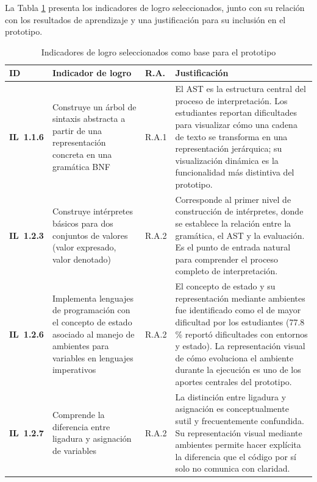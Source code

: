 La Tabla \ref{tabla:indicadores_logro_prototipo} presenta los indicadores de logro seleccionados, junto con su relación con los resultados de aprendizaje y una justificación para su inclusión en el prototipo.

\begin{table}[H]
\centering
\caption{Indicadores de logro seleccionados como base para el prototipo}
\label{tabla:indicadores_logro_prototipo}
\footnotesize
\setlength{\tabcolsep}{3pt}

\begin{tabular}{
>{\centering\arraybackslash}p{1.5cm}
>{\raggedright\arraybackslash}p{3.8cm}
>{\centering\arraybackslash}p{1cm}
>{\raggedright\arraybackslash}p{7cm}
}
\hline
\textbf{ID} & \textbf{Indicador de logro} & \textbf{R.A.} & \textbf{Justificación} \\
\hline

\textbf{IL~1.1.6} &
Construye un árbol de sintaxis abstracta a partir de una representación concreta en una gramática BNF &
R.A.1 &
El AST es la estructura central del proceso de interpretación. Los estudiantes reportan dificultades para visualizar cómo una cadena de texto se transforma en una representación jerárquica; su visualización dinámica es la funcionalidad más distintiva del prototipo. \\

\textbf{IL~1.2.3} &
Construye intérpretes básicos para dos conjuntos de valores (valor expresado, valor denotado) &
R.A.2 &
Corresponde al primer nivel de construcción de intérpretes, donde se establece la relación entre la gramática, el AST y la evaluación. Es el punto de entrada natural para comprender el proceso completo de interpretación. \\

\textbf{IL~1.2.6} &
Implementa lenguajes de programación con el concepto de estado asociado al manejo de ambientes para variables en lenguajes imperativos &
R.A.2 &
El concepto de estado y su representación mediante ambientes fue identificado como el de mayor dificultad por los estudiantes (77.8\,\% reportó dificultades con entornos y estado). La representación visual de cómo evoluciona el ambiente durante la ejecución es uno de los aportes centrales del prototipo. \\

\textbf{IL~1.2.7} &
Comprende la diferencia entre ligadura y asignación de variables &
R.A.2 &
La distinción entre ligadura y asignación es conceptualmente sutil y frecuentemente confundida. Su representación visual mediante ambientes permite hacer explícita la diferencia que el código por sí solo no comunica con claridad. \\


\end{tabular}
\end{table}
